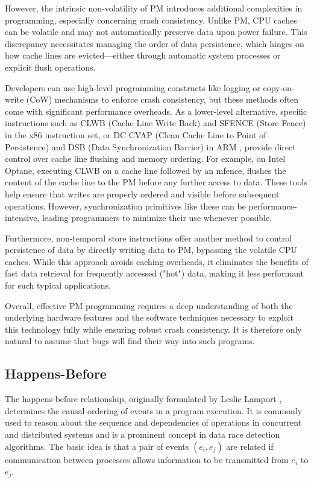 \documentclass[nonacm,sigplan]{acmart}
\begin{document}
However, the intrinsic non-volatility of PM introduces additional complexities in programming, especially concerning crash consistency. Unlike PM, CPU caches can be volatile and may not automatically preserve data upon power failure. This discrepancy necessitates managing the order of data persistence, which hinges on how cache lines are evicted—either through automatic system processes or explicit flush operations.

Developers can use high-level programming constructs like logging or copy-on-write (CoW) mechanisms to enforce crash consistency, but these methods often come with significant performance overheads. As a lower-level alternative, specific instructions such as CLWB (Cache Line Write Back) and SFENCE (Store Fence) in the x86 instruction set, or DC CVAP (Clean Cache Line to Point of Persistence) and DSB (Data Synchronization Barrier) in ARM \cite{arm2020abi}, provide direct control over cache line flushing and memory ordering.
For example, on Intel Optane, executing CLWB on a cache line followed by an mfence, flushes the content of the cache line to the PM before any further access to data.
These tools help ensure that writes are properly ordered and visible before subsequent operations.
However, synchronization primitives like these can be performance-intensive, leading programmers to minimize their use whenever possible.

Furthermore, non-temporal store instructions offer another method to control persistence of data by directly writing data to PM, bypassing the volatile CPU caches. While this approach avoids caching overheads, it eliminates the benefits of fast data retrieval for frequently accessed ("hot") data, making it less performant for such typical applications.

Overall, effective PM programming requires a deep understanding of both the underlying hardware features and the software techniques necessary to exploit this technology fully while ensuring robust crash consistency. It is therefore only natural to assume that bugs will find their way into such programs.

\subsection{Happens-Before}
The happens-before relationship, originally formulated by Leslie Lamport \cite{lamport1978}, determines the causal ordering of events in a program execution. It is commonly used to reason about the sequence and dependencies of operations in concurrent and distributed systems and is a prominent concept in data race detection algorithms.
The basic idea is that a pair of events $(e_i, e_j)$ are related if communication between processes allows information to be transmitted from $e_i$ to $e_j$.
\end{document}
